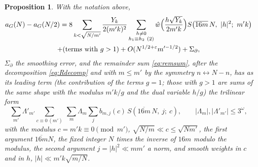 ﻿\documentclass[11pt]{amsart}
\newtheorem{proposition}[theorem]{Proposition}
\theoremstyle{remark}
\newcommand{\e}{\varepsilon}
\begin{document}
\begin{proposition}\label{prop:dispersion}
With the notation above,
\begin{multline}\label{eq:dispmain}
a_G(N)-a_G(N/2)=8\sum_{k<\sqrt{N/m'}}\frac{Y_k}{2(m'k)^2}\sum_{\substack{h\ne0\\ h_1\equiv h_2\ (2)}}\hat w\Bigl(\frac{h\sqrt{Y_k}}{2m'k}\Bigr)S\bigl(\overline{16m}\,N,\ |h|^2;\ m'k\bigr)\\
+(\text{terms with }g>1)+O(N^{1/2+\e}m'^{-1/2})+\Sigma_\partial ,
\end{multline}
$\Sigma_\partial$ the smoothing error, and the remainder sum \eqref{eq:remsum}, after the decomposition \eqref{eq:Rdecomp} and with $m\le m'$ by the symmetry $n\leftrightarrow N-n$, has as its leading term (the contribution of the terms $g=1$; those with $g>1$ are sums of the same shape with the modulus $m'k/g$ and the dual variable $h/g$) the trilinear form
\begin{equation}\label{eq:trilinear}
\sum_{m'}\Lambda'_{m'}\sum_{c\equiv0\ (m')}\ \sum_{m}\Lambda_m\sum_{j}b_{m,j}(c)\,S(\overline{16m}\,N,\ j;\ c),\qquad |\Lambda_m|,|\Lambda'_{m'}|\le3^{\omega},
\end{equation}
with the modulus $c=m'k\equiv0\pmod{m'}$, $\sqrt{N/m}\ll c\le\sqrt{Nm'}$, the first argument $\overline{16m}N$, the fixed integer $N$ times the inverse of $16m$ modulo the modulus, the second argument $j=|h|^2\ll mm'$ a norm, and smooth weights in $c$ and in $h$, $|h|\ll m'k\sqrt{m/N}$.
\end{proposition}
\end{document}
